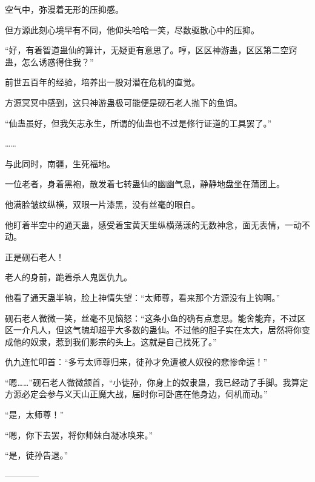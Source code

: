 \begin{this_body}
空气中，弥漫着无形的压抑感。

但方源此刻心境早有不同，他仰头哈哈一笑，尽数驱散心中的压抑。

“好，有着智道蛊仙的算计，无疑更有意思了。哼，区区神游蛊，区区第二空窍蛊，怎么诱惑得住我？”

前世五百年的经验，培养出一股对潜在危机的直觉。

方源冥冥中感到，这只神游蛊极可能便是砚石老人抛下的鱼饵。

“仙蛊虽好，但我矢志永生，所谓的仙蛊也不过是修行证道的工具罢了。”

……

与此同时，南疆，生死福地。

一位老者，身着黑袍，散发着七转蛊仙的幽幽气息，静静地盘坐在蒲团上。

他满脸皱纹纵横，双眼一片漆黑，没有丝毫的眼白。

他盯着半空中的通天蛊，感受着宝黄天里纵横荡漾的无数神念，面无表情，一动不动。

正是砚石老人！

老人的身前，跪着杀人鬼医仇九。

他看了通天蛊半晌，脸上神情失望：“太师尊，看来那个方源没有上钩啊。”

砚石老人微微一笑，丝毫不见恼怒：“这条小鱼的确有点意思。能舍能弃，不过区区一介凡人，但这气魄却超乎大多数的蛊仙。不过他的胆子实在太大，居然将你变成他的奴隶，惹到我们影宗的头上。这就是自己找死了。”

仇九连忙叩首：“多亏太师尊归来，徒孙才免遭被人奴役的悲惨命运！”

“嗯……”砚石老人微微颔首，“小徒孙，你身上的奴隶蛊，我已经动了手脚。我算定方源必定会参与义天山正魔大战，届时你可卧底在他身边，伺机而动。”

“是，太师尊！”

“嗯，你下去罢，将你师妹白凝冰唤来。”

“是，徒孙告退。”

------------

\end{this_body}

